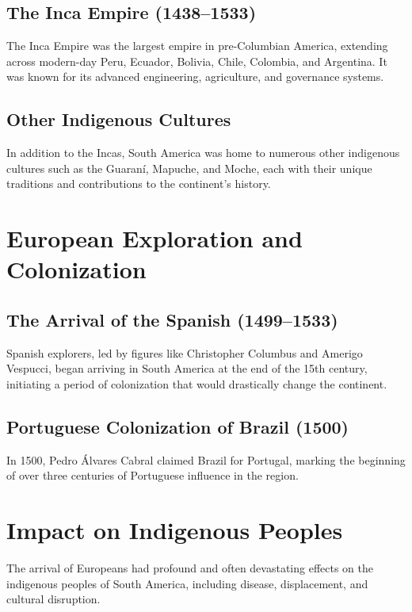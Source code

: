 \documentclass[a4paper,12pt]{book}
\begin{document}
\subsection{The Inca Empire (1438–1533)}
\label{subsec:inca-empire}
The Inca Empire was the largest empire in pre-Columbian America, extending across modern-day Peru, Ecuador, Bolivia, Chile, Colombia, and Argentina. It was known for its advanced engineering, agriculture, and governance systems.

\subsection{Other Indigenous Cultures}
\label{subsec:other-indigenous-cultures}
In addition to the Incas, South America was home to numerous other indigenous cultures such as the Guaraní, Mapuche, and Moche, each with their unique traditions and contributions to the continent’s history.

\section{European Exploration and Colonization}
\label{sec:european-exploration-colonization}

\subsection{The Arrival of the Spanish (1499–1533)}
\label{subsec:arrival-spanish}
Spanish explorers, led by figures like Christopher Columbus and Amerigo Vespucci, began arriving in South America at the end of the 15th century, initiating a period of colonization that would drastically change the continent.

\subsection{Portuguese Colonization of Brazil (1500)}
\label{subsec:portuguese-colonization-brazil}
In 1500, Pedro Álvares Cabral claimed Brazil for Portugal, marking the beginning of over three centuries of Portuguese influence in the region.

\section{Impact on Indigenous Peoples}
\label{sec:impact-indigenous-peoples}
The arrival of Europeans had profound and often devastating effects on the indigenous peoples of South America, including disease, displacement, and cultural disruption.
\end{document}
